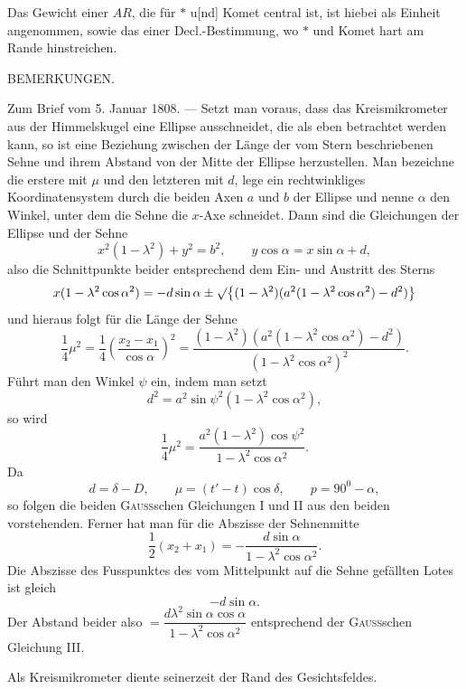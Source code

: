 Das Gewicht einer $AR$, die für $\ast$ u[nd] Komet central ist, ist hiebei als Einheit angenommen, sowie das einer Decl.-Bestimmung, wo $\ast$ und Komet hart am Rande hinstreichen.
\begingroup\renewcommand{\thefootnote}{[*)}\footnotetext{Beobachtungen des Kometen 1821, Berl. Astron. Jahrbuch für 1825, Werke VI, S. 439.]}\endgroup
\begin{center}BEMERKUNGEN.\end{center}
\begingroup\small
\noindent\hspace*{\parindent}Zum Brief vom 5. Januar 1808. — Setzt man voraus, dass das Kreismikrometer aus der Himmelskugel eine Ellipse ausschneidet, die als eben betrachtet werden kann, so ist eine Beziehung zwischen der Länge der vom Stern beschriebenen Sehne und ihrem Abstand von der Mitte der Ellipse herzustellen. Man bezeichne die erstere mit $\mu$ und den letzteren mit $d$, lege ein rechtwinkliges Koordinatensystem durch die beiden Axen $a$ und $b$ der Ellipse und nenne $\alpha$ den Winkel, unter dem die Sehne die $x$-Axe schneidet.
\clearpage{}
\noindent Dann sind die Gleichungen der Ellipse und der Sehne
\[x^2(1-\lambda^2)+y^2=b^2,\qquad y\cos\alpha=x\sin\alpha+d,\]
\noindent also die Schnittpunkte beider entsprechend dem Ein- und Austritt des Sterns
\[x(1-\lambda^2\cos\alpha^2)=-d\sin\alpha\pm\surd\bigl\{(1-\lambda^2)(a^2(1-\lambda^2\cos\alpha^2)-d^2)\bigr\}\]
\noindent und hieraus folgt für die Länge der Sehne
\[\frac14\mu^2=\frac14\left(\frac{x_2-x_1}{\cos\alpha}\right)^2=\frac{(1-\lambda^2)(a^2(1-\lambda^2\cos\alpha^2)-d^2)}{(1-\lambda^2\cos\alpha^2)^2}.\]
\noindent\hspace*{\parindent}Führt man den Winkel $\psi$ ein, indem man setzt
\[d^2=a^2\sin\psi^2(1-\lambda^2\cos\alpha^2),\]
\noindent so wird
\[\frac14\mu^2=\frac{a^2(1-\lambda^2)\cos\psi^2}{1-\lambda^2\cos\alpha^2}.\]
\noindent\hspace*{\parindent}Da
\[d=\delta-D,\qquad\mu=(t'-t)\cos\delta,\qquad p=90^0-\alpha,\]
\noindent so folgen die beiden \textsc{Gauss}schen Gleichungen I und II aus den beiden vorstehenden. Ferner hat man für die Abszisse der Sehnenmitte
\[\frac12(x_2+x_1)=-\frac{d\sin\alpha}{1-\lambda^2\cos\alpha^2}.\]
\noindent Die Abszisse des Fusspunktes des vom Mittelpunkt auf die Sehne gefällten Lotes ist gleich
\[-d\sin\alpha.\]
\noindent Der Abstand beider also $=\dfrac{d\lambda^2\sin\alpha\cos\alpha}{1-\lambda^2\cos\alpha^2}$ entsprechend der \textsc{Gauss}schen Gleichung III.

Als Kreismikrometer diente seinerzeit der Rand des Gesichtsfeldes.

